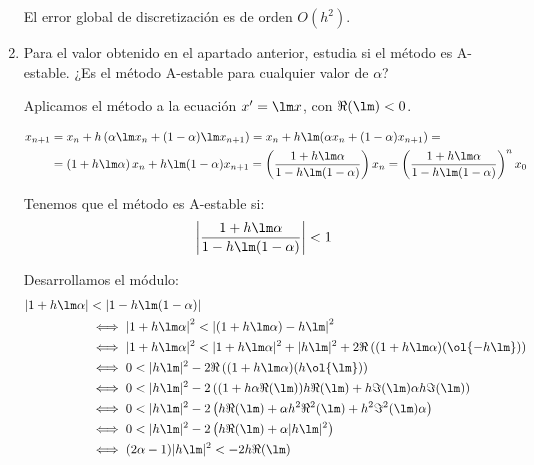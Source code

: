 \begin{ejercicio}
\begin{enumerate}
        El error global de discretización es de orden $O(h^2)$.

        \item Para el valor obtenido en el apartado anterior, estudia si el método es A-estable. ¿Es el método A-estable para cualquier valor de $\alpha$?
        
        Aplicamos el método a la ecuación $x' = \lm x$, con $\Re(\lm) < 0$.
        \begin{comment}
        \begin{align*}
            x_{n+1} &= x_n + h \left( \alpha \lm x_n + (1 - \alpha) \lm x_{n+1} \right)
            = x_n + \frac{h\lm}{2}(x_n + x_{n+1})
            =\\&= \left(1+ \frac{h\lm}{2}\right)x_n + \frac{h\lm}{2}x_{n+1}
            = \left(\dfrac{1+\frac{h\lm}{2}}{1 - \frac{h\lm}{2}}\right)x_{n}
            = \left(\dfrac{2+h\lm}{2 - h\lm}\right)x_{n}
            = \left(\dfrac{2+h\lm}{2 - h\lm}\right)^nx_{0}
        \end{align*}
        \end{comment}
        \begin{align*}
            x_{n+1} &= x_n + h \left( \alpha \lm x_n + (1 - \alpha) \lm x_{n+1} \right)
            = x_n + h\lm(\alpha x_n + (1-\alpha)x_{n+1})
            =\\&= \left(1+ h\lm\alpha\right)x_n + h\lm(1-\alpha)x_{n+1}
            = \left(\dfrac{1+h\lm\alpha}{1 - h\lm(1-\alpha)}\right)x_{n}
            = \left(\dfrac{1+h\lm\alpha}{1 - h\lm(1-\alpha)}\right)^nx_{0}
        \end{align*}

        Tenemos que el método es A-estable si:
        \begin{equation*}
            \left|\dfrac{1+h\lm\alpha}{1 - h\lm(1-\alpha)}\right| < 1
        \end{equation*}

        Desarrollamos el módulo:
        \begin{align*}
            \left|1+h\lm\alpha\right| &< \left|1 - h\lm(1-\alpha)\right| \\
            &\iff \left|1+h\lm\alpha\right|^2 < \left|(1 +h\lm\alpha) -h\lm\right|^2 \\
            &\iff |1+h\lm\alpha|^2 < |1 +h\lm\alpha|^2 + |h\lm|^2+2\Re\left((1+h\lm\alpha)(\ol{-h\lm})\right) \\
            &\iff 0 < |h\lm|^2-2\Re\left((1+h\lm\alpha)(h\ol{\lm})\right) \\
            &\iff 0 < |h\lm|^2-2\left((1+h\alpha\Re(\lm))h\Re(\lm) + h\Im(\lm)\alpha h\Im(\lm)\right) \\
            &\iff 0 < |h\lm|^2-2\left(h\Re(\lm)+\alpha h^2\Re^2(\lm)+ h^2\Im^2(\lm)\alpha \right) \\
            &\iff 0 < |h\lm|^2-2\left(h\Re(\lm)+\alpha |h\lm|^2\right) \\
            &\iff (2\alpha-1)|h\lm|^2 < -2h\Re(\lm)
        \end{align*}



\end{enumerate}
\end{ejercicio}
